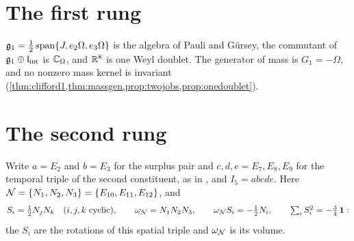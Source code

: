 \section{The first rung}

$\mathfrak g_1=\tfrac12\,\mathrm{span}\{J,e_2\Omega,e_3\Omega\}$ is the algebra of Pauli and G\"ursey, the commutant of $\mathfrak g_1\oplus\mathfrak l_{\rm int}$
is $\mathbb{C}_\Omega$, and $\mathbb{R}^8$ is one Weyl doublet. The generator of mass is $G_1=-\Omega$, and no nonzero mass kernel is invariant
(\cref{thm:clifford1,thm:massgen,prop:twojobs,prop:onedoublet}).

\section{The second rung}
\label{sec:rung2}

Write $a=E_2$ and $b=E_3$ for the surplus pair and $c,d,e=E_7,E_8,E_9$ for the temporal triple of the second constituent, as in
, and $I_5=abcde$. Here $\mathcal N=\{N_1,N_2,N_3\}=\{E_{10},E_{11},E_{12}\}$, and
\[
S_i=\half N_jN_k\quad(i,j,k\ \text{cyclic}),\qquad \omega_\cN=N_1N_2N_3,\qquad \omega_\cN S_i=-\half N_i,\qquad \textstyle\sum_iS_i^2=-\tfrac34\,\id :
\]
the $S_i$ are the rotations of this spatial triple and $\omega_\mathcal N$ is its volume.

